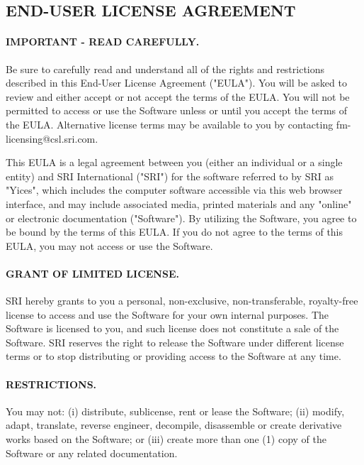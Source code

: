 \documentclass[11pt,twoside,fleqn,openright,titlepage]{cslreport}
\begin{document}
\begin{small}
\subsection*{END-USER LICENSE AGREEMENT}

\paragraph{IMPORTANT - READ CAREFULLY.}  Be  sure to carefully read and
understand all of the rights and restrictions described in this
End-User License Agreement ("EULA").  You will be asked to review and
either accept or not accept the terms of the EULA.  You will not be
permitted to access or use the Software unless or until you accept the
terms of the EULA.  Alternative license terms may be available to you
by contacting fm-licensing@csl.sri.com.

This EULA is a legal agreement  between you (either an individual or a
single entity) and SRI International ("SRI") for the software referred
to by SRI as "Yices",  which includes the computer software accessible
via  this web  browser interface,  and may  include  associated media,
printed  materials  and   any  "online"  or  electronic  documentation
("Software").  By utilizing the Software, you agree to be bound by the
terms of this  EULA.  If you do  not agree to the terms  of this EULA,
you may not access or use the Software.

\paragraph{GRANT  OF LIMITED  LICENSE.}   SRI  hereby grants  to  you a
 personal,  non-exclusive, non-transferable,  royalty-free license  to
 access  and use  the Software  for your  own internal  purposes.  The
 Software is licensed  to you, and such license does  not constitute a
 sale of the Software.  SRI reserves the right to release the Software
 under different  license terms or  to stop distributing  or providing
 access to the Software at any time.

\paragraph{RESTRICTIONS.} You may not:  (i) distribute, sublicense, rent
or lease the Software; (ii) modify, adapt, translate, reverse
engineer, decompile, disassemble or create derivative works based on
the Software; or (iii) create more than one (1) copy of the Software
or any related documentation.


\end{small}
\end{document}
